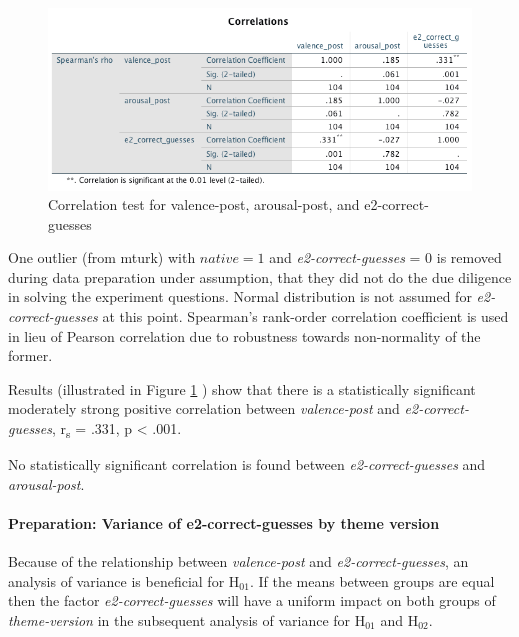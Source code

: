 	\begin{figure}
		\centering
		\includegraphics[width=1\linewidth]{graphics/correlationE2-correct-guesses-affect-post}
		\caption{Correlation test for valence-post, arousal-post, and e2-correct-guesses}
		\label{fig:correlatione2-correct-guesses-affect-post}
	\end{figure}
	
	One outlier (from mturk) with \(native = 1\) and \textit{e2-correct-guesses} = 0 is removed during data preparation under assumption, that they did not do the due diligence in solving the experiment questions. Normal distribution is not assumed for \textit{e2-correct-guesses} at this point. Spearman's rank-order correlation coefficient is used in lieu of Pearson correlation due to robustness towards non-normality of the former.
	
	
	Results (illustrated in Figure \ref{fig:correlatione2-correct-guesses-affect-post} ) show that there is a statistically significant moderately strong positive correlation between \textit{valence-post} and \textit{e2-correct-guesses}, r\textsubscript{s} = .331, p < .001.
	
	No statistically significant correlation is found between \textit{e2-correct-guesses} and \textit{arousal-post}.
	
	\paragraph{Preparation: Variance of e2-correct-guesses by theme version}
	
	Because of the relationship between \textit{valence-post} and \textit{e2-correct-guesses}, an analysis of variance is beneficial for H$_{01}$. If the means between groups are equal then the factor \textit{e2-correct-guesses} will have a uniform impact on both groups of \textit{theme-version} in the subsequent analysis of variance for H$_{01}$ and H$_{02}$.
	
